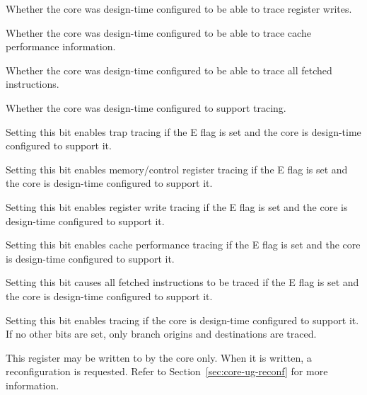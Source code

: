 Whether the core was design-time configured to be able to trace register writes.

\reset{*}

Whether the core was design-time configured to be able to trace cache
performance information.

\reset{*}

Whether the core was design-time configured to be able to trace all fetched
instructions.

\reset{*}

Whether the core was design-time configured to support tracing.

\debugCanWrite{}

Setting this bit enables trap tracing if the E flag is set and the core is 
design-time configured to support it.

\debugCanWrite{}

Setting this bit enables memory/control register tracing if the E flag is set 
and the core is design-time configured to support it.

\debugCanWrite{}

Setting this bit enables register write tracing if the E flag is set and the 
core is design-time configured to support it.

\debugCanWrite{}

Setting this bit enables cache performance tracing if the E flag is set and the 
core is design-time configured to support it.

\debugCanWrite{}

Setting this bit causes all fetched instructions to be traced if the E flag is 
set and the core is design-time configured to support it.

\debugCanWrite{}

Setting this bit enables tracing if the core is design-time configured to 
support it. If no other bits are set, only branch origins and destinations are 
traced.


This register may be written to by the core only. When it is written, a
reconfiguration is requested. Refer to Section~\ref{sec:core-ug-reconf} for more
information.

\coreCanWrite{}

